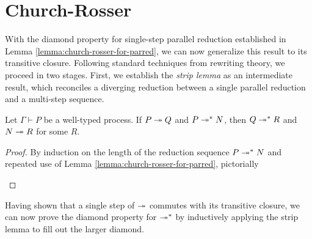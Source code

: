 \section{Church-Rosser}
With the diamond property for single-step parallel reduction established in
Lemma \ref{lemma:church-rosser-for-parred}, we can now generalize this result to its transitive closure.
Following standard techniques from rewriting theory, we proceed in two stages.
First, we establish the \emph{strip lemma} as an intermediate result, which
reconciles a diverging reduction between a single parallel reduction
and a multi-step sequence.

\begin{lemma} \label{lemma:strip-lemma}
  Let $\Gamma \vdash P$ be a well-typed process.
  If $P \twoheadrightarrow Q$ and $P \twoheadrightarrow^* N$, then $Q \twoheadrightarrow^* R$ and $N \twoheadrightarrow R$ for some $R$.
\end{lemma}
\begin{proof}
  By induction on the length of the reduction sequence $P \twoheadrightarrow^* N$
  and repeated use of Lemma \ref{lemma:church-rosser-for-parred}, pictorially
  \begin{center}
\end{center}
\end{proof}

Having shown that a single step of $\twoheadrightarrow$ commutes with its transitive closure,
we can now prove the diamond property for $\twoheadrightarrow^*$ by inductively applying
the strip lemma to fill out the larger diamond.

